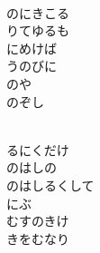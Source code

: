 \documentclass[10pt,b5j]{tarticle} %
\begin{document}
\begin{enumerate}
\begin{minipage}[c]{\blocksize}
        \vspace{\linespace}
        \item~\\
        のにきこる\\
        りてゆるも\\
        にめけば\\
        うのびに\\
        のや\\
        のぞし
        
        \vspace{\linespace}
        \item~\\
        るにくだけ\\
        のはしの\\
        のはしるくして\\
        にぶ\\
        むすのきけ\\
        きをむなり
    
    \end{minipage}
\end{enumerate} %
\end{document}
